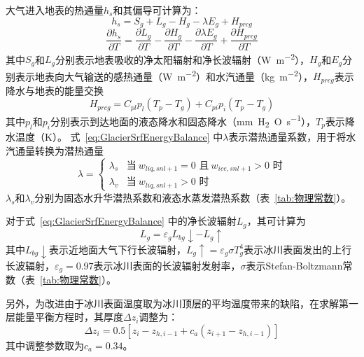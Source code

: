 大气进入地表的热通量$h_s$和其偏导可计算为：
\begin{equation}\label{eq:GlacierSrfEnergyBalance}
    h_s = S_g + L_g - H_g - \lambda E_g + H_{prcg}
\end{equation}
\begin{equation}
    \frac{\partial h_s}{\partial T} = \frac{\partial L_g}{\partial T} -\frac{\partial H_g}{\partial T} -\frac{\partial \lambda E_g}{\partial T} +\frac{\partial H_{prcg}}{\partial T}
\end{equation}
其中$S_g$和$L_g$分别表示地表吸收的净太阳辐射和净长波辐射（\unit{W.m^{-2}}），$H_g$和$E_g$分别表示地表向大气输送的感热通量（\unit{W.m^{-2}}）和水汽通量（\unit{kg.m^{-2}}），$H_{prcg}$表示降水与地表的能量交换
\begin{equation}
    H_{prcg} = C_{pl}p_l\left(T_p-T_g\right) + C_{pi}p_i\left(T_p-T_g\right)
\end{equation}
其中$p_l$和$p_i$分别表示到达地面的液态降水和固态降水（\unit{mm.H_2O.s^{-1}}），$T_p$表示降水温度（K）。
式~\eqref{eq:GlacierSrfEnergyBalance} 中$\lambda$表示潜热通量系数，用于将水汽通量转换为潜热通量
\begin{equation}
    \lambda = \begin{cases}
        \lambda_s &\text{当}\ w_{liq,snl+1}=0\text{ 且}\ w_{ice,snl+1}>0\text{ 时}\\
        \lambda_v &\text{当}\ w_{liq,snl+1}>0\text{ 时}
    \end{cases}
\end{equation}
$\lambda_s$和$\lambda_v$分别为固态水升华潜热系数和液态水蒸发潜热系数（表~\ref{tab:物理常数}）。

对于式~\eqref{eq:GlacierSrfEnergyBalance} 中的净长波辐射$L_g$，其可计算为
\begin{equation}
    L_g = \varepsilon_g L_{bg}\downarrow - L_g\uparrow
\end{equation}
其中$L_{bg}\downarrow$表示近地面大气下行长波辐射，$L_g\uparrow=\varepsilon_g\sigma T^4_g$表示冰川表面发出的上行长波辐射，$\varepsilon_g=0.97$表示冰川表面的长波辐射发射率，$\sigma$表示Stefan-Boltzmann常数（表~\ref{tab:物理常数}）。

另外，为改进由于冰川表面温度取为冰川顶层的平均温度带来的缺陷，在求解第一层能量平衡方程时，其厚度$\Delta z_i$调整为：
\begin{equation}
    \Delta z_i = 0.5\left[z_i-z_{h,i-1}+c_a\left(z_{i+1}-z_{h,i-1}\right)\right]
\end{equation}
其中调整参数取为$c_a=0.34$。

